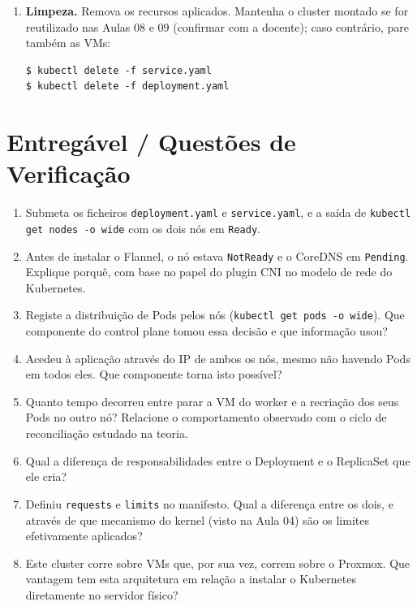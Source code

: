 \documentclass[11pt,a4paper]{article}
\begin{document}
\begin{enumerate}[label=\arabic*.,resume]
  \item \textbf{Limpeza.} Remova os recursos aplicados. Mantenha o cluster montado se for reutilizado nas Aulas 08 e 09 (confirmar com a docente); caso contrário, pare também as VMs:
\begin{lstlisting}
$ kubectl delete -f service.yaml
$ kubectl delete -f deployment.yaml
\end{lstlisting}

\end{enumerate}

\section{Entregável / Questões de Verificação}
\begin{enumerate}[label=\alph*)]
  \setlength\itemsep{0.2cm}
  \item Submeta os ficheiros \texttt{deployment.yaml} e \texttt{service.yaml}, e a saída de \texttt{kubectl get nodes -o wide} com os dois nós em \texttt{Ready}.
  \item Antes de instalar o Flannel, o nó estava \texttt{NotReady} e o CoreDNS em \texttt{Pending}. Explique porquê, com base no papel do plugin CNI no modelo de rede do Kubernetes.
  \item Registe a distribuição de Pods pelos nós (\texttt{kubectl get pods -o wide}). Que componente do control plane tomou essa decisão e que informação usou?
  \item Acedeu à aplicação através do IP de ambos os nós, mesmo não havendo Pods em todos eles. Que componente torna isto possível?
  \item Quanto tempo decorreu entre parar a VM do worker e a recriação dos seus Pods no outro nó? Relacione o comportamento observado com o ciclo de reconciliação estudado na teoria.
  \item Qual a diferença de responsabilidades entre o Deployment e o ReplicaSet que ele cria?
  \item Definiu \texttt{requests} e \texttt{limits} no manifesto. Qual a diferença entre os dois, e através de que mecanismo do kernel (visto na Aula 04) são os limites efetivamente aplicados?
  \item Este cluster corre sobre VMs que, por sua vez, correm sobre o Proxmox. Que vantagem tem esta arquitetura em relação a instalar o Kubernetes diretamente no servidor físico?
\end{enumerate}
\end{document}
